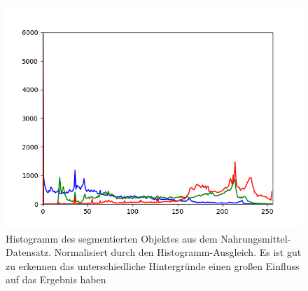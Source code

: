 \begin{appendices}
\begin{figure}[htb]
\begin{minipage}[c]{0.08\textwidth}
\end{minipage}
\hfill
\begin{minipage}[c]{0.3\textwidth}
\includegraphics[width=\textwidth]{Sources/Bild3_HA_histo.png}
\end{minipage}
\caption{Histogramm des segmentierten Objektes aus dem Nahrungsmittel-Datensatz. Normalisiert durch den Histogramm-Ausgleich. Es ist gut zu erkennen das unterschiedliche Hintergründe einen großen Einfluss auf das Ergebnis haben}
\label{img:evalHA}
\end{figure}
\newpage
\begin{figure}[htb]
\begin{minipage}[c]{0.2\textwidth}

\end{minipage}
\end{figure}
\end{appendices}
